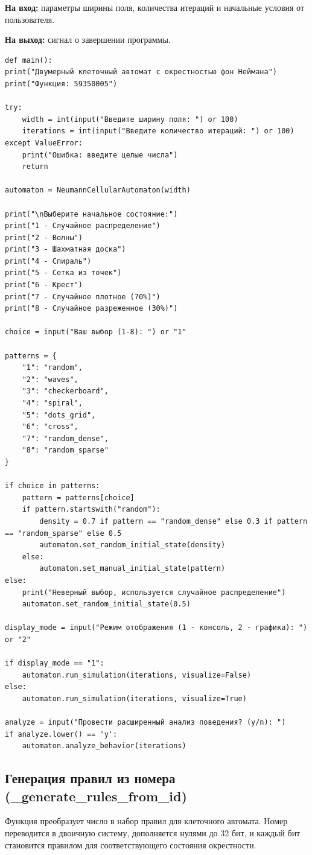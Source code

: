 \documentclass[11pt,a4paper,final]{article}
\begin{document}
	\textbf{На вход:} параметры ширины поля, количества итераций и начальные условия от пользователя.  
	\par\textbf{На выход:} сигнал о завершении программы.
	
	\begin{verbatim}
def main():
print("Двумерный клеточный автомат с окрестностью фон Неймана")
print("Функция: 59350005")

try:
	width = int(input("Введите ширину поля: ") or 100)
	iterations = int(input("Введите количество итераций: ") or 100)
except ValueError:
	print("Ошибка: введите целые числа")
	return

automaton = NeumannCellularAutomaton(width)

print("\nВыберите начальное состояние:")
print("1 - Случайное распределение")
print("2 - Волны")
print("3 - Шахматная доска")
print("4 - Спираль")
print("5 - Сетка из точек")
print("6 - Крест")
print("7 - Случайное плотное (70%)")
print("8 - Случайное разреженное (30%)")

choice = input("Ваш выбор (1-8): ") or "1"

patterns = {
	"1": "random",
	"2": "waves",
	"3": "checkerboard",
	"4": "spiral",
	"5": "dots_grid",
	"6": "cross",
	"7": "random_dense",
	"8": "random_sparse"
}

if choice in patterns:
	pattern = patterns[choice]
	if pattern.startswith("random"):
		density = 0.7 if pattern == "random_dense" else 0.3 if pattern == "random_sparse" else 0.5
		automaton.set_random_initial_state(density)
	else:
		automaton.set_manual_initial_state(pattern)
else:
	print("Неверный выбор, используется случайное распределение")
	automaton.set_random_initial_state(0.5)

display_mode = input("Режим отображения (1 - консоль, 2 - графика): ") or "2"

if display_mode == "1":
	automaton.run_simulation(iterations, visualize=False)
else:
	automaton.run_simulation(iterations, visualize=True)

analyze = input("Провести расширенный анализ поведения? (y/n): ")
if analyze.lower() == 'y':
	automaton.analyze_behavior(iterations)
	\end{verbatim}
	
	\subsection{Генерация правил из номера (\_generate\_rules\_from\_id)}
	
	Функция преобразует число в набор правил для клеточного автомата. Номер переводится в двоичную систему, дополняется нулями до 32 бит, и каждый бит становится правилом для соответствующего состояния окрестности.
	
\end{document}

